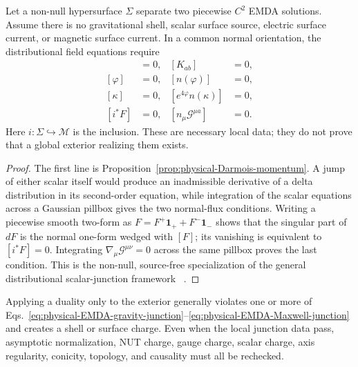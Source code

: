 \begin{proposition}
\label{prop:physical-EMDA-junction-data}
Let a non-null hypersurface $\Sigma$ separate two piecewise $C^2$ EMDA
solutions. Assume there is no gravitational shell, scalar surface source,
electric surface current, or magnetic surface current. In a common normal
orientation, the distributional field equations require
\begin{align}
 [h_{ab}]&=0,
 &
 [K_{ab}]&=0,
 \label{eq:physical-EMDA-gravity-junction}\\
 [\varphi]&=0,
 &
 [n(\varphi)]&=0,
 \label{eq:physical-EMDA-dilaton-junction}\\
 [\kappa]&=0,
 &
 [e^{4\varphi}n(\kappa)]&=0,
 \label{eq:physical-EMDA-axion-junction}\\
 [i^*F]&=0,
 &
 [n_\mu\mathcal G^{\mu a}]&=0.
 \label{eq:physical-EMDA-Maxwell-junction}
\end{align}
Here $i:\Sigma\hookrightarrow\mathcal M$ is the inclusion. These are
necessary local data; they do not prove that a global exterior realizing
them exists.
\end{proposition}

\begin{proof}
The first line is Proposition~\ref{prop:physical-Darmois-momentum}. A jump
of either scalar itself would produce an inadmissible derivative of a delta
distribution in its second-order equation, while integration of the scalar
equations across a Gaussian pillbox gives the two normal-flux conditions.
Writing a piecewise smooth two-form as
$F=F^+\mathbf 1_++F^-\mathbf 1_-$ shows that the singular part of $dF$ is
the normal one-form wedged with $[F]$; its vanishing is equivalent to
$[i^*F]=0$. Integrating
$\nabla_\mu\mathcal G^{\mu\nu}=0$ across the same pillbox proves the last
condition. This is the non-null, source-free specialization of the general
distributional scalar-junction framework
~\cite{BarrabesBressange1997CQG}.
\end{proof}

Applying a duality only to the exterior generally violates one or more of
Eqs.~\eqref{eq:physical-EMDA-gravity-junction}--\eqref{eq:physical-EMDA-Maxwell-junction}
and creates a shell or surface charge. Even when the local junction data
pass, asymptotic normalization, NUT charge, gauge charge, scalar charge,
axis regularity, conicity, topology, and causality must all be rechecked.

